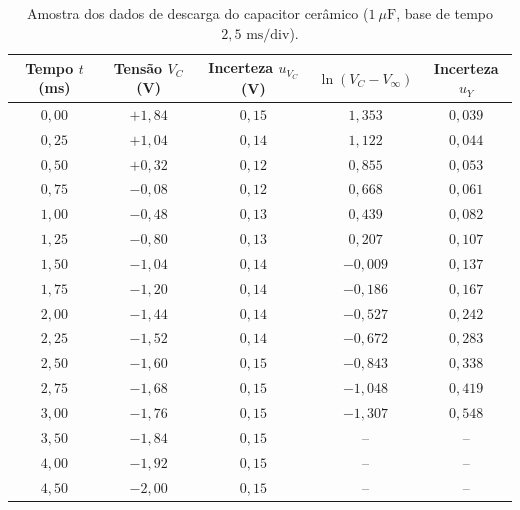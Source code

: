 \documentclass[12pt, a4paper]{article}
\begin{document}
\begin{table}[H]
    \centering
    \caption{Amostra dos dados de descarga do capacitor cerâmico ($1\ \mu\text{F}$, base de tempo $2{,}5\text{ ms/div}$).}
    \label{tab:dados_ceramico}
    \small
    \begin{tabular}{ccccc}
        \toprule
        \textbf{Tempo $t$ (ms)} & \textbf{Tensão $V_C$ (V)} & \textbf{Incerteza $u_{V_C}$ (V)} & \textbf{$\ln(V_C - V_{\infty})$} & \textbf{Incerteza $u_Y$} \\
        \midrule
        $0{,}00$ & $+1{,}84$ & $0{,}15$ & $1{,}353$ & $0{,}039$ \\
        $0{,}25$ & $+1{,}04$ & $0{,}14$ & $1{,}122$ & $0{,}044$ \\
        $0{,}50$ & $+0{,}32$ & $0{,}12$ & $0{,}855$ & $0{,}053$ \\
        $0{,}75$ & $-0{,}08$ & $0{,}12$ & $0{,}668$ & $0{,}061$ \\
        $1{,}00$ & $-0{,}48$ & $0{,}13$ & $0{,}439$ & $0{,}082$ \\
        $1{,}25$ & $-0{,}80$ & $0{,}13$ & $0{,}207$ & $0{,}107$ \\
        $1{,}50$ & $-1{,}04$ & $0{,}14$ & $-0{,}009$ & $0{,}137$ \\
        $1{,}75$ & $-1{,}20$ & $0{,}14$ & $-0{,}186$ & $0{,}167$ \\
        $2{,}00$ & $-1{,}44$ & $0{,}14$ & $-0{,}527$ & $0{,}242$ \\
        $2{,}25$ & $-1{,}52$ & $0{,}14$ & $-0{,}672$ & $0{,}283$ \\
        $2{,}50$ & $-1{,}60$ & $0{,}15$ & $-0{,}843$ & $0{,}338$ \\
        $2{,}75$ & $-1{,}68$ & $0{,}15$ & $-1{,}048$ & $0{,}419$ \\
        $3{,}00$ & $-1{,}76$ & $0{,}15$ & $-1{,}307$ & $0{,}548$ \\
        $3{,}50$ & $-1{,}84$ & $0{,}15$ & -- & -- \\
        $4{,}00$ & $-1{,}92$ & $0{,}15$ & -- & -- \\
        $4{,}50$ & $-2{,}00$ & $0{,}15$ & -- & -- \\
        \bottomrule
    \end{tabular}
\end{table}
\end{document}
